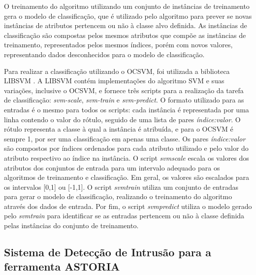 \documentclass[cic,tc]{iiufrgs}
\begin{document}
O treinamento do algoritmo utilizando um conjunto de instâncias de treinamento gera o modelo de classificação, que é utilizado pelo algoritmo para prever se novas instâncias de atributos pertencem ou não à classe alvo definida. As instâncias de classificação são compostas pelos mesmos atributos que compõe as instâncias de treinamento, representados pelos mesmos índices, porém com novos valores, representando dados desconhecidos para o modelo de classificação.

Para realizar a classificação utilizando o OCSVM, foi utilizada a biblioteca LIBSVM \cite{libsvm}. A LIBSVM contém implementações do algoritmo SVM e suas variações, inclusive o OCSVM, e fornece três scripts para a realização da tarefa de classificação: \emph{svm-scale}, \emph{svm-train} e \emph{svm-predict}. O formato utilizado para as entradas é o mesmo para todos os scripts: cada instância é representada por uma linha contendo o valor do rótulo, seguido de uma lista de pares \emph{índice:valor}. O rótulo representa a classe à qual a instância é atribuída, e para o OCSVM é sempre 1, por ser uma classificação em apenas uma classe. Os pares \emph{índice:valor} são compostos por índices ordenados para cada atributo utilizado e pelo valor do atributo respectivo ao índice na instância. O script \emph{svmscale} escala os valores dos atributos dos conjuntos de entrada para um intervalo adequado para os algoritmos de treinamento e classificação. Em geral, os valores são escalados para os intervalos [0,1] ou [-1,1]. O script \emph{svmtrain} utiliza um conjunto de entradas para gerar o modelo de classificação, realizando o treinamento do algoritmo através dos dados de entrada. Por fim, o script \emph{svmpredict} utiliza o modelo gerado pelo \emph{svmtrain} para identificar se as entradas pertencem ou não à classe definida pelas instâncias do conjunto de treinamento.


\subsection{Sistema de Detecção de Intrusão para a ferramenta ASTORIA}
\label{subsec:sdimodel}
\end{document}
